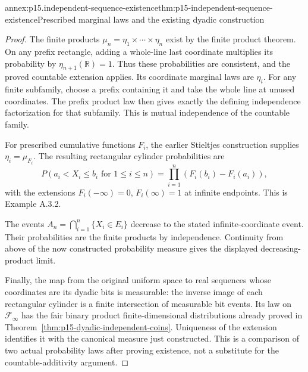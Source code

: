 \begin{annexitem}{annex:p15.independent-sequence-existence}{thm:p15-independent-sequence-existence}{Prescribed marginal laws and the existing dyadic construction}
\begin{proof}
The finite products \(\mu_n=\eta_1\times\cdots\times\eta_n\)
exist by the finite product theorem. On any prefix rectangle,
adding a whole-line last coordinate multiplies its probability
by \(\eta_{n+1}(\mathbb R)=1\). Thus these probabilities
are consistent, and the proved countable extension applies.
Its coordinate marginal laws are \(\eta_i\). For any finite
subfamily, choose a prefix containing it and take the whole line
at unused coordinates. The prefix product law then gives exactly
the defining independence factorization for that subfamily.
This is mutual independence of the countable family.

For prescribed cumulative functions \(F_i\), the earlier
Stieltjes construction supplies \(\eta_i=\mu_{F_i}\).
The resulting rectangular cylinder probabilities are
\[
 P(a_i<X_i\leq b_i\text{ for }1\leq i\leq n)
                   =\prod_{i=1}^n(F_i(b_i)-F_i(a_i)),
\]
with the extensions \(F_i(-\infty)=0\), \(F_i(\infty)=1\)
at infinite endpoints. This is Example A.3.2.

The events \(A_n=\bigcap_{i=1}^n\{X_i\in E_i\}\)
decrease to the stated infinite-coordinate event. Their probabilities
are the finite products by independence. Continuity from above
of the now constructed probability measure gives the displayed
decreasing-product limit.

Finally, the map from the original uniform space to real sequences
whose coordinates are its dyadic bits is measurable: the inverse
image of each rectangular cylinder is a finite intersection of
measurable bit events. Its law on \(\mathcal F_\infty\)
has the fair binary product finite-dimensional distributions
already proved in Theorem~\ref{thm:p15-dyadic-independent-coins}.
Uniqueness of the extension identifies it with the canonical
measure just constructed. This is a comparison of two actual
probability laws after proving existence, not a substitute for
the countable-additivity argument.
\end{proof}
\end{annexitem}

